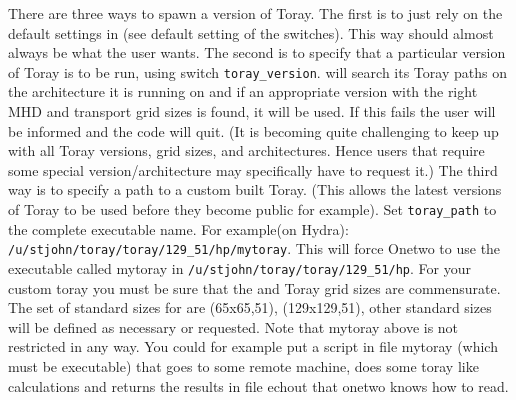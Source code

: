 There are three ways to spawn a version of Toray. The first is to just rely on
the default settings in \ot (see default setting of the switches). This way
should almost always be what the user wants. The second is to specify that a
particular version of Toray is to be run, using switch \texttt{toray\_version}.
\ot will search its Toray paths on the architecture it is running on  and if an
appropriate version with the right MHD and transport grid sizes is found, it
will be used. If this fails the user will be informed and the code will quit.
(It is becoming quite challenging to keep up with all Toray versions, grid
sizes,  and architectures. Hence users that require some special
version/architecture may specifically have to request it.) The third way is to
specify a path to a custom built Toray. (This allows the latest  versions of
Toray to be used before they become public for example). Set
\texttt{toray\_path} to the complete executable name. For example(on Hydra): 
\texttt{/u/stjohn/toray/toray/129\_51/hp/mytoray}.
This will force Onetwo to use the executable called mytoray in
\texttt{/u/stjohn/toray/toray/129\_51/hp}.
For your custom toray you must be sure that the \ot and Toray grid sizes are
commensurate. The set of standard sizes for \ot are  (65x65,51), (129x129,51),
other standard sizes will be defined as necessary or requested. Note that
mytoray above is not restricted in any way. You could for example put a script
in file mytoray (which must be executable) that goes to some remote machine,
does some toray like calculations and returns the results in file echout that
onetwo knows how to read.

